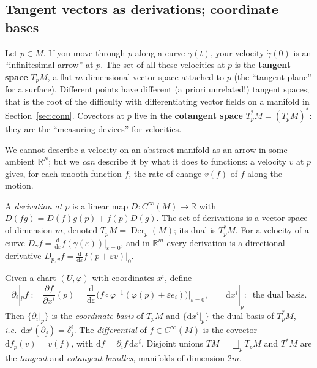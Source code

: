\documentclass[11pt,a4paper]{article}
\numberwithin{equation}{section}
\theoremstyle{definition}
\theoremstyle{plain}
\newcommand{\R}{\mathbb{R}}
\newcommand{\dd}{\mathrm{d}}
\newcommand{\Der}{\operatorname{Der}}
\newcommand{\ie}{\emph{i.e.}\ }
\begin{document}
\subsection{Tangent vectors as derivations; coordinate bases}\label{sec:tangentvectors}
\begin{intuition}[{velocities}]
Let $p\in M$. If you move through $p$ along a curve $\gamma(t)$, your velocity $\dot\gamma(0)$ is an ``infinitesimal arrow'' at $p$. The set of all these velocities at $p$ is the \textbf{tangent space} $T_pM$, a flat $m$-dimensional vector space attached to $p$ (the ``tangent plane'' for a surface). Different points have different (a priori unrelated!) tangent spaces; that is the root of the difficulty with differentiating vector fields on a manifold in Section~\ref{sec:conn}. Covectors at $p$ live in the \textbf{cotangent space} $T^*_pM=(T_pM)^*$: they are the ``measuring devices'' for velocities.

We cannot describe a velocity on an abstract manifold as an arrow in some ambient $\R^N$; but we \emph{can} describe it by what it does to functions: a velocity $v$ at $p$ gives, for each smooth function $f$, the rate of change $v(f)$ of $f$ along the motion.
\end{intuition}

\begin{formal}
A \emph{derivation at $p$} is a linear map $D:C^\infty(M)\to\R$ with $D(fg)=D(f)g(p)+f(p)D(g)$. The set of derivations is a vector space of dimension $m$, denoted $T_pM=\Der_p(M)$; its dual is $T^*_pM$. For a velocity of a curve $D_\gamma f=\frac{\dd}{\dd\varepsilon}f(\gamma(\varepsilon))|_{\varepsilon=0}$, and in $\R^m$ every derivation is a directional derivative $D_{p,v}f=\frac{\dd}{\dd\varepsilon}f(p+\varepsilon v)|_0$.

Given a chart $(U,\varphi)$ with coordinates $x^i$, define
\[
\partial_i|_p f:=\frac{\partial f}{\partial x^i}(p)=\frac{\dd}{\dd\varepsilon}\Big(f\circ\varphi^{-1}(\varphi(p)+\varepsilon e_i)\Big)\Big|_{\varepsilon=0},\qquad
\dd x^i|_p:\ \text{ the dual basis.}
\]
Then $\{\partial_i|_p\}$ is the \emph{coordinate basis} of $T_pM$ and $\{\dd x^i|_p\}$ the dual basis of $T_p^*M$, \ie $\dd x^i(\partial_j)=\delta^i_j$. The \emph{differential} of $f\in C^\infty(M)$ is the covector $\dd f_p(v)=v(f)$, with $\dd f=\partial_if\,\dd x^i$. Disjoint unions $TM=\bigsqcup_pT_pM$ and $T^*M$ are the \emph{tangent} and \emph{cotangent bundles}, manifolds of dimension $2m$.
\end{formal}
\end{document}
